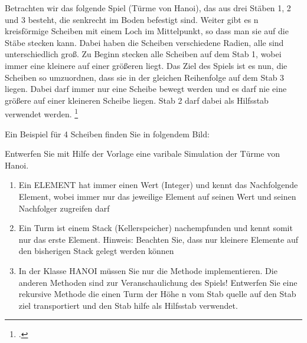\documentclass{bschlangaul-aufgabe}
\begin{document}


Betrachten wir das folgende Spiel (Türme von Hanoi), das aus drei Stäben
1, 2 und 3 besteht, die senkrecht im Boden befestigt sind. Weiter gibt
es n kreisförmige Scheiben mit einem Loch im Mittelpunkt, so dass man
sie auf die Stäbe stecken kann. Dabei haben die Scheiben verschiedene
Radien, alle sind unterschiedlich groß. Zu Beginn stecken alle Scheiben
auf dem Stab 1, wobei immer eine kleinere auf einer größeren liegt. Das
Ziel des Spiels ist es nun, die Scheiben so umzuordnen, dass sie in der
gleichen Reihenfolge auf dem Stab 3 liegen. Dabei darf immer nur eine
Scheibe bewegt werden und es darf nie eine größere auf einer kleineren
Scheibe liegen. Stab 2 darf dabei als Hilfsstab verwendet werden.
\footcite[Seite 1, Aufgabe 2: Türme von Hanoi]{aud:ab:7}

Ein Beispiel für 4 Scheiben finden Sie in folgendem Bild:

\centerline{}

Entwerfen Sie mit Hilfe der Vorlage eine varibale Simulation der Türme von Hanoi.

\begin{enumerate}
\item Ein ELEMENT hat immer einen Wert (Integer) und kennt das
Nachfolgende Element, wobei immer nur das jeweilige Element auf seinen
Wert und seinen Nachfolger zugreifen darf

\item Ein Turm ist einem Stack (Kellerspeicher) nachempfunden und kennt
somit nur das erste Element. Hinweis: Beachten Sie, dass nur kleinere
Elemente auf den bisherigen Stack gelegt werden können

\item In der Klasse HANOI müssen Sie nur die Methode  implementieren. Die
anderen Methoden sind zur Veranschaulichung des Spiels! Entwerfen Sie
eine rekursive Methode die einen Turm der Höhe n vom Stab quelle auf den
Stab ziel transportiert und den Stab hilfe als Hilfsstab verwendet.
\end{enumerate}
\end{document}
